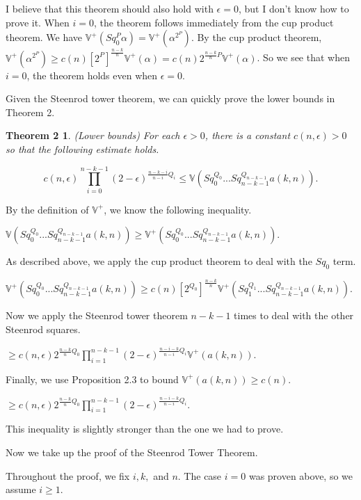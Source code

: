 \documentclass{amsart}
\newtheorem*{Theorem 1}{Theorem 1}
\newtheorem*{Theorem 2}{Theorem 2}
\newtheorem*{Theorem 1A}{Theorem 1A}
\newtheorem*{Theorem 2A}{Theorem 2A}
\newtheorem*{vanishing lemma}{Vanishing Lemma}
\numberwithin{equation}{section}
\begin{document}
I believe that this theorem should also hold with $\epsilon = 0$,
but I don't know how to prove it.  When $i=0$, the theorem
follows immediately from the cup product theorem.
We have $\mathbb{V}^+(Sq_0^P \alpha) =
\mathbb{V}^+(\alpha^{2^P})$.  By the cup product theorem, $\mathbb{V}^+
(\alpha^{2^P}) \ge c(n) [2^P]^{\frac{n-k}{n}} \mathbb{V}^+(\alpha) = c(n)
2^{\frac{n-k}{n} P} \mathbb{V}^+(\alpha)$.  
So we see that when $i=0$, the theorem holds even when $\epsilon = 0$.

Given the Steenrod tower theorem, we can quickly prove the lower bounds
in Theorem 2.

\begin{Theorem 2} (Lower bounds) For each $\epsilon > 0$, there is a constant
$c(n, \epsilon) > 0$ so that the following estimate holds.

$$c(n, \epsilon) \prod_{i=0}^{n-k-1} (2 -
\epsilon)^{\frac{n-k-i}{n-i} Q_i} \le \mathbb{V}(Sq_0^{Q_0} ...
Sq_{n-k-1}^{Q_{n-k-1}} a(k,n)).$$

\end{Theorem 2}

\proof By the definition of $\mathbb{V}^+$, we know the following inequality.

$\mathbb{V}(Sq_0^{Q_0} ... Sq_{n-k-1}^{Q_{n-k-1}} a(k,n)) \ge
\mathbb{V}^+(Sq_0^{Q_0} ... Sq_{n-k-1}^{Q_{n-k-1}} a(k,n))$.

As described above, we apply the cup product theorem to deal with the
$Sq_0$ term.

$\mathbb{V}^+(Sq_0^{Q_0} ... Sq_{n-k-1}^{Q_{n-k-1}} a(k,n)) \ge
c(n) [2^{Q_0}]^{\frac{n-k}{n}} \mathbb{V}^+(Sq_1^{Q_1} ... Sq_{n-k-1}^{Q_{n-k-1}} a(k,n)).$

Now we apply the Steenrod tower theorem $n-k-1$ times to deal with the other
Steenrod squares.

$\ge c(n, \epsilon) 2^{\frac{n-k}{n} Q_0} \prod_{i=1}^{n-k-1} (2 - \epsilon)^{\frac{n-i-k}{n-i} Q_i}
\mathbb{V}^+(a(k,n)).$

Finally, we use Proposition 2.3 to bound $\mathbb{V}^+(a(k,n)) \ge c(n)$.

$\ge c(n, \epsilon) 2^{\frac{n-k}{n} Q_0} \prod_{i=1}^{n-k-1} (2 - \epsilon)^{\frac{n-i-k}{n-i} Q_i}.$

This inequality is slightly stronger than the one we had to prove. \endproof

Now we take up the proof of the Steenrod Tower Theorem.

\proof Throughout the proof, we fix $i, k,$ and $n$.  The case $i=0$ was
proven above, so we assume $i \ge 1$.
\end{document}
